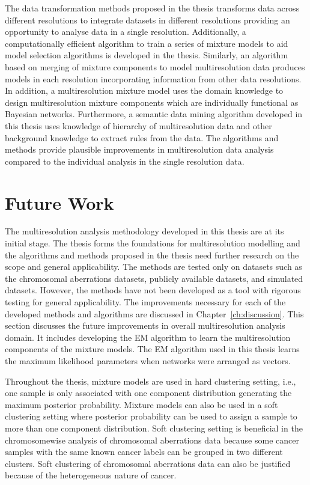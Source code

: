 The data transformation methods proposed in the thesis transforms 
data across different resolutions to integrate datasets in different 
resolutions providing an opportunity to analyse data in a single 
resolution. Additionally, a computationally efficient algorithm to 
train a series of mixture models to aid model selection algorithms 
is developed in the thesis. Similarly, an algorithm based on merging 
of mixture components to model multiresolution data produces models 
in each resolution incorporating information from other data resolutions. 
In addition, a multiresolution mixture model uses the domain knowledge
to design multiresolution mixture components which are individually 
functional as Bayesian networks. Furthermore, a semantic data mining 
algorithm developed in this thesis uses knowledge of hierarchy
of multiresolution data and other background knowledge
to extract rules from the data. The algorithms and methods
provide plausible improvements in multiresolution data 
analysis compared to the individual analysis in the single 
resolution data.

\section{Future Work}
\label{s:finfuture}

The multiresolution analysis methodology developed in this thesis 
are at its initial stage. 
The thesis  forms the foundations for multiresolution modelling
and the algorithms and methods proposed in the thesis need further
research on the scope and general applicability. The methods
are tested only on datasets such as the chromosomal aberrations 
datasets, publicly available datasets, and simulated 
datasets. However, the methods have not been developed as a tool 
with rigorous testing for general applicability. The improvements 
necessary for each of the developed methods and algorithms 
are discussed in Chapter~\ref{ch:discussion}. This section discusses
the future improvements in overall multiresolution analysis domain. 
It includes developing the EM algorithm to learn 
the multiresolution components of the mixture models.
The EM algorithm used in this thesis learns the maximum 
likelihood parameters when networks were arranged as vectors.


Throughout the thesis, mixture models are used in hard clustering
setting, i.e., one sample is only associated with one component 
distribution generating the maximum posterior probability. 
Mixture models can also be used in a soft clustering
setting where posterior probability can be used to assign a 
sample to more than one component distribution. Soft clustering 
setting is beneficial in the chromosomewise analysis of 
chromosomal aberrations data because some cancer samples with 
the same known cancer labels can be grouped in two different
clusters. Soft clustering of chromosomal aberrations data
can also be justified because of the heterogeneous nature 
of cancer. 

